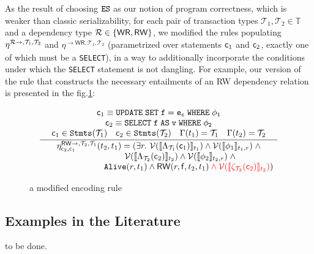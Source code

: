 As the result of choosing $\texttt{ES}$ as our notion of program correctness, which is weaker than classic
serializability, for each pair of transaction types $\mathcal{T}_1,\mathcal{T}_2
\in \mathbb{T}$ and a dependency type $\mathcal{R}\in\{\mathsf{WR},\mathsf{RW}\}$,  we modified the 
rules populating $\eta^{\mathcal{R}\rightarrow,\mathcal{T}_1,\mathcal{T}_2}_{} $ and 
$\eta^{\rightarrow\mathsf{WR},\mathcal{T}_1,\mathcal{T}_2}_{} $ (parametrized
over statements $\mathsf{c}_1$ and $\mathsf{c}_2$, exactly one of which must be a
\texttt{SELECT}), in a way to additionally
incorporate the conditions under which the \texttt{SELECT} statement is not
dangling. 
For example, our version of the rule that constructs the necessary entailments 
of an \textrm{RW} dependency relation is presented in the fig.\ref{fig:rwtus}:


\begin{figure}[h]
	$$
	\RULE
		{\mcmd_1 \equiv \tt{UPDATE\; SET}\; f = e_c\; \tt{WHERE}\; \phi_1 \\ 
		 \mcmd_2 \equiv \tt{SELECT} \; f \;\tt{AS}\; v\; \tt{WHERE}\; \phi_2 \\ 
		 \mcmd_1 \in  \C{Stmts}(\mathcal{T}_1) \quad \mcmd_2 \in  \C{Stmts}(\mathcal{T}_2) \quad \Gamma(t_1) = \mathcal{T}_1 \quad \Gamma(t_2) = \mathcal{T}_2}
		{ \eta_{\mcmd_2, \mcmd_1}^{\F{RW}\rightarrow,\mathcal{T}_2,\mathcal{T}_1}(t_2, t_1) =  
		 (\exists r.\ 
		 \mathcal{V}(\llbracket \Lambda_{\mathcal{T}_1}(\mcmd_1) \rrbracket_{t_1}) 
		  \wedge \mathcal{V}(\llbracket \phi_1 \rrbracket_{t_1, r} ) 
		 \; \wedge  \\ \myQQuad{5} \mathcal{V}(\llbracket  \Lambda_{\mathcal{T}_2}(\mcmd_2) \rrbracket_{t_2}) 
	    	\wedge \mathcal{V}(\llbracket \phi_2 \rrbracket_{t_2, r}) 
		 \; \wedge \\ \myQQuad{7}\C{Alive}(r, t_1)  \wedge \F{RW}(r, \F{f}, t_2, t_1)
 				\color{red} 
					\wedge \mathcal{V}(\llbracket  \zeta_{\mathcal{T}_2}(\mcmd_2) \rrbracket_{t_2}) 

 				\color{black})
	
}
	$$

\caption{a modified encoding rule}
\label{fig:rwtus}
\end{figure}






\subsection{Examples in the Literature}
to be done.


